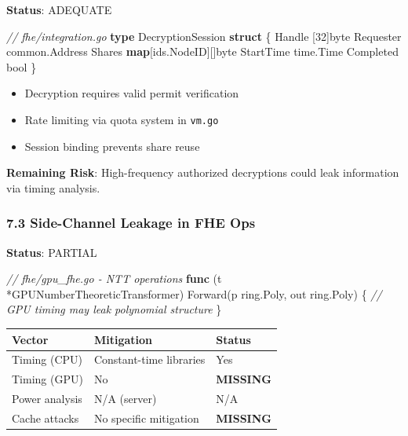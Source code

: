 \documentclass[
]{article}
\newenvironment{Shaded}{}{}
\newcommand{\CommentTok}[1]{\textcolor[rgb]{0.38,0.63,0.69}{\textit{#1}}}
\newcommand{\DataTypeTok}[1]{\textcolor[rgb]{0.56,0.13,0.00}{#1}}
\newcommand{\DecValTok}[1]{\textcolor[rgb]{0.25,0.63,0.44}{#1}}
\newcommand{\KeywordTok}[1]{\textcolor[rgb]{0.00,0.44,0.13}{\textbf{#1}}}
\newcommand{\NormalTok}[1]{#1}
\newcommand{\OperatorTok}[1]{\textcolor[rgb]{0.40,0.40,0.40}{#1}}
\newcounter{none} %
\providecommand{\tightlist}{%
  \setlength{\itemsep}{0pt}\setlength{\parskip}{0pt}}
\begin{document}
\textbf{Status}: ADEQUATE

\begin{Shaded}
\begin{Highlighting}[]
\CommentTok{// fhe/integration.go}
\KeywordTok{type}\NormalTok{ DecryptionSession }\KeywordTok{struct} \OperatorTok{\{}
\NormalTok{    Handle      }\OperatorTok{[}\DecValTok{32}\OperatorTok{]}\DataTypeTok{byte}
\NormalTok{    Requester   common}\OperatorTok{.}\NormalTok{Address}
\NormalTok{    Shares      }\KeywordTok{map}\OperatorTok{[}\NormalTok{ids}\OperatorTok{.}\NormalTok{NodeID}\OperatorTok{][]}\DataTypeTok{byte}
\NormalTok{    StartTime   time}\OperatorTok{.}\NormalTok{Time}
\NormalTok{    Completed   }\DataTypeTok{bool}
\OperatorTok{\}}
\end{Highlighting}
\end{Shaded}

\begin{itemize}
\tightlist
\item
  Decryption requires valid permit verification
\item
  Rate limiting via quota system in \texttt{vm.go}
\item
  Session binding prevents share reuse
\end{itemize}

\textbf{Remaining Risk}: High-frequency authorized decryptions could
leak information via timing analysis.

\subsubsection{7.3 Side-Channel Leakage in FHE
Ops}\label{73-side-channel-leakage-in-fhe-ops}

\textbf{Status}: PARTIAL

\begin{Shaded}
\begin{Highlighting}[]
\CommentTok{// fhe/gpu\_fhe.go {-} NTT operations}
\KeywordTok{func} \OperatorTok{(}\NormalTok{t }\OperatorTok{*}\NormalTok{GPUNumberTheoreticTransformer}\OperatorTok{)}\NormalTok{ Forward}\OperatorTok{(}\NormalTok{p ring}\OperatorTok{.}\NormalTok{Poly}\OperatorTok{,}\NormalTok{ out ring}\OperatorTok{.}\NormalTok{Poly}\OperatorTok{)} \OperatorTok{\{}
    \CommentTok{// GPU timing may leak polynomial structure}
\OperatorTok{\}}
\end{Highlighting}
\end{Shaded}

{\def\LTcaptype{none} %
\begin{longtable}[]{@{}lll@{}}
\toprule\noalign{}
Vector & Mitigation & Status \\
\midrule\noalign{}
\endhead
\bottomrule\noalign{}
\endlastfoot
Timing (CPU) & Constant-time libraries & Yes \\
Timing (GPU) & No & \textbf{MISSING} \\
Power analysis & N/A (server) & N/A \\
Cache attacks & No specific mitigation & \textbf{MISSING} \\
\end{longtable}
}
\end{document}
